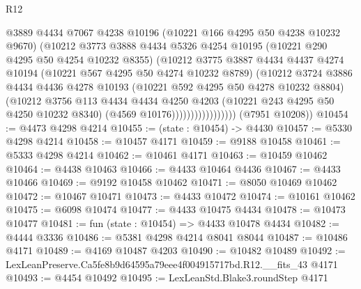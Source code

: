 \begin{lexlean}{R12}
\begin{coremodule}
                              @3889
                              @4434
                              @7067
                              @4238
                              @10196
                              (@10221 @166 @4295 @50 @4238 @10232 @9670)
                              (@10212
                                @3773
                                @3888
                                @4434
                                @5326
                                @4254
                                @10195
                                (@10221 @290 @4295 @50 @4254 @10232 @8355)
                                (@10212
                                  @3775
                                  @3887
                                  @4434
                                  @4437
                                  @4274
                                  @10194
                                  (@10221 @567 @4295 @50 @4274 @10232 @8789)
                                  (@10212
                                    @3724
                                    @3886
                                    @4434
                                    @4436
                                    @4278
                                    @10193
                                    (@10221 @592 @4295 @50 @4278 @10232 @8804)
                                    (@10212
                                      @3756
                                      @113
                                      @4434
                                      @4434
                                      @4250
                                      @4203
                                      (@10221 @243 @4295 @50 @4250 @10232 @8340)
                                      (@4569 @10176)))))))))))))))))
      (@7951 @10208))
@10454 := @4473 @4298 @4214
@10455 := (state : @10454) -> @4430
@10457 := @5330 @4298 @4214
@10458 := @10457 @4171
@10459 := @9188 @10458
@10461 := @5333 @4298 @4214
@10462 := @10461 @4171
@10463 := @10459 @10462
@10464 := @4438 @10463
@10466 := @4433 @10464 @4436
@10467 := @4433 @10466
@10469 := @9192 @10458 @10462
@10471 := @8050 @10469 @10462
@10472 := @10467 @10471
@10473 := @4433 @10472
@10474 := @10161 @10462
@10475 := @6098 @10474
@10477 := @4433 @10475 @4434
@10478 := @10473 @10477
@10481 := fun (state : @10454) => @4433 @10478 @4434
@10482 := @4444 @3336
@10486 := @5381 @4298 @4214 @8041 @8044
@10487 := @10486 @4171
@10489 := @4169 @10487 @4203
@10490 := @10482 @10489
@10492 := LexLeanPreserve.Ca5fe8b9d64595a79eee4f004915717bd.R12.__fits_43 @4171
@10493 := @4454 @10492
@10495 := LexLeanStd.Blake3.roundStep @4171

\end{coremodule}
\end{lexlean}
